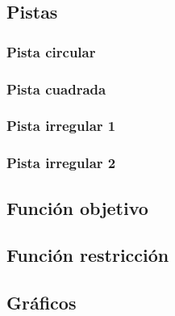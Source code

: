 \documentclass[a4paper,10pt]{book}
\newcommand{\R}{\mathbbm{R}}
\newcommand{\arr}{\rightarrow}
\newcommand{\la}{\langle}
\newcommand{\ra}{\rangle}
\newtheorem{defi}[teo]{Definici\'on}
\begin{document}
\subsection{Pistas}\label{pistas}
\subsubsection{Pista circular}

\subsubsection{Pista cuadrada}

\subsubsection{Pista irregular 1}

\subsubsection{Pista irregular 2}


\subsection{Función objetivo}\label{fobj}


\subsection{Función restricción}\label{fres}


\subsection{Gráficos}\label{graficar}


% 


\end{document}
